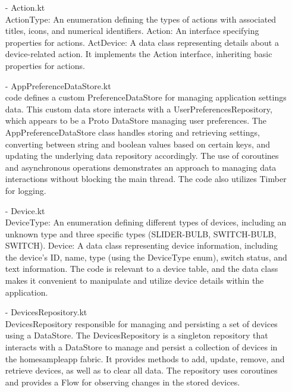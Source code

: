 \begin{enumerate}
                        \item[-] Action.kt\\
                              ActionType: An enumeration defining the types of actions with associated titles, icons, and numerical identifiers.
                              Action: An interface specifying properties for actions.
                              ActDevice: A data class representing details about a device-related action. It implements the Action interface, inheriting basic properties for actions.\\
                        \item[-] AppPreferenceDataStore.kt\\
                              code defines a custom PreferenceDataStore for managing application settings data. This custom data store interacts with a UserPreferencesRepository, which appears to be a Proto DataStore managing user preferences. The AppPreferenceDataStore class handles storing and retrieving settings, converting between string and boolean values based on certain keys, and updating the underlying data repository accordingly.
                              The use of coroutines and asynchronous operations demonstrates an approach to managing data interactions without blocking the main thread. The code also utilizes Timber for logging.\\
                        \item[-] Device.kt\\
                              DeviceType: An enumeration defining different types of devices, including an unknown type and three specific types (SLIDER-BULB, SWITCH-BULB, SWITCH).
                              Device: A data class representing device information, including the device's ID, name, type (using the DeviceType enum), switch status, and text information.
                              The code is relevant to a device table, and the data class makes it convenient to manipulate and utilize device details within the application.\\
                        \item[-] DevicesRepository.kt\\
                              DevicesRepository responsible for managing and persisting a set of devices using a DataStore.
                              The DevicesRepository is a singleton repository that interacts with a DataStore to manage and persist a collection of devices in the homesampleapp fabric. It provides methods to add, update, remove, and retrieve devices, as well as to clear all data. The repository uses coroutines and provides a Flow for observing changes in the stored devices.

\end{enumerate}
